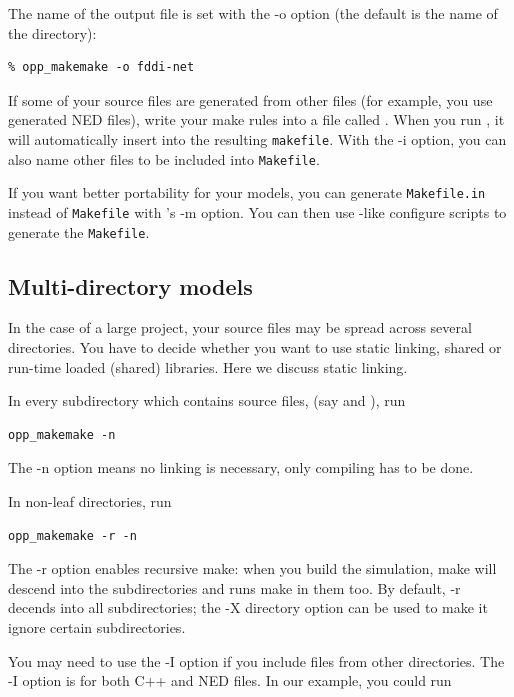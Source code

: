 The name of the output file is set with the -o
option (the default is the name of the directory):

\begin{verbatim}
% opp_makemake -o fddi-net
\end{verbatim}

If some of your source files are generated from other files (for
example, you use generated NED files), write your make rules
into a file called . When you run , it
will automatically insert  into the resulting \texttt{makefile}.
With the -i option, you can also name other files to be included into
\texttt{Makefile}.


If you want better portability for your models, you can generate
\texttt{Makefile.in} instead of \texttt{Makefile} with 's
-m option. You can then use -like configure scripts to generate
the \texttt{Makefile}.




\subsection{Multi-directory models}

In the case of a large project, your source files may be spread across
several directories. You have to decide whether you want to use static
linking, shared or run-time loaded (shared)
libraries. Here we discuss static linking.

In every subdirectory which contains source files, (say  and
), run

\begin{verbatim}
opp_makemake -n
\end{verbatim}

The -n option means no linking is necessary, only compiling has
to be done.

In non-leaf directories, run

\begin{verbatim}
opp_makemake -r -n
\end{verbatim}

The -r option enables recursive make: when you build the simulation, make
will descend into the subdirectories and runs make in them too.
By default, -r decends into all subdirectories; the -X directory option
can be used to make it ignore certain subdirectories.

You may need to use the -I option if you include files from other
directories. The -I option is for both C++ and NED
files. In our example, you could run

